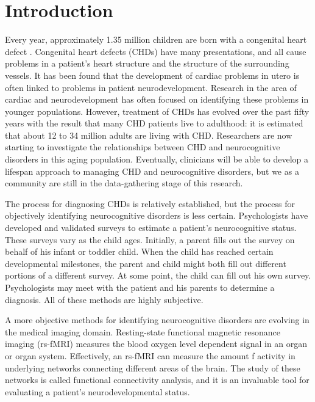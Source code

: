 \chapter{Introduction}
\label{ch:intro}

Every year, approximately 1.35 million children are born with a congenital heart defect \cite{VanderLinde2011}. Congenital heart defects (CHDs) have many presentations, and all cause problems in a patient's heart structure and the structure of the surrounding vessels. It has been found that the development of cardiac problems in utero is often linked to problems in patient neurodevelopment. Research in the area of cardiac and neurodevelopment has often focused on identifying these problems in younger populations. However, treatment of CHDs has evolved over the past fifty years with the result that many CHD patients live to adulthood: it is estimated that about 12 to 34 million adults are living with CHD. Researchers are now starting to investigate the relationships between CHD and neurocognitive disorders in this aging population. Eventually, clinicians will be able to develop a lifespan approach to managing CHD and neurocognitive disorders, but we as a community are still in the data-gathering stage of this research.

The process for diagnosing CHDs is relatively established, but the process for objectively identifying neurocognitive disorders is less certain. Psychologists have developed and validated surveys to estimate a patient's neurocognitive status. These surveys vary as the child ages. Initially, a parent fills out the survey on behalf of his infant or toddler child. When the child has reached certain developmental milestones, the parent and child might both fill out different portions of a different survey. At some point, the child can fill out his own survey. Psychologists may meet with the patient and his parents to determine a diagnosis. All of these methods are highly subjective. 

A more objective methods for identifying neurocognitive disorders are evolving in the medical imaging domain. 
Resting-state functional magnetic resonance imaging (rs-fMRI) measures the blood oxygen level dependent signal in an organ or organ system. Effectively, an rs-fMRI can measure the amount f activity in underlying networks connecting different areas of the brain. The study of these networks is called functional connectivity analysis, and it is an invaluable tool for evaluating a patient's neurodevelopmental status. 


